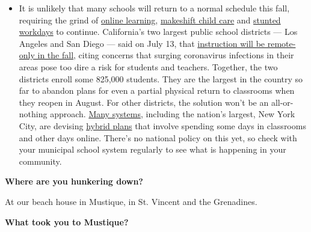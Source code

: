 \begin{itemize}
  \begin{itemize}
  \tightlist
  \item
    It is unlikely that many schools will return to a normal schedule
    this fall, requiring the grind of
    \href{https://www.nytimes3xbfgragh.onion/2020/06/05/us/coronavirus-education-lost-learning.html?action=click\&pgtype=Article\&state=default\&region=MAIN_CONTENT_3\&context=storylines_faq}{online
    learning},
    \href{https://www.nytimes3xbfgragh.onion/2020/05/29/us/coronavirus-child-care-centers.html?action=click\&pgtype=Article\&state=default\&region=MAIN_CONTENT_3\&context=storylines_faq}{makeshift
    child care} and
    \href{https://www.nytimes3xbfgragh.onion/2020/06/03/business/economy/coronavirus-working-women.html?action=click\&pgtype=Article\&state=default\&region=MAIN_CONTENT_3\&context=storylines_faq}{stunted
    workdays} to continue. California's two largest public school
    districts --- Los Angeles and San Diego --- said on July 13, that
    \href{https://www.nytimes3xbfgragh.onion/2020/07/13/us/lausd-san-diego-school-reopening.html?action=click\&pgtype=Article\&state=default\&region=MAIN_CONTENT_3\&context=storylines_faq}{instruction
    will be remote-only in the fall}, citing concerns that surging
    coronavirus infections in their areas pose too dire a risk for
    students and teachers. Together, the two districts enroll some
    825,000 students. They are the largest in the country so far to
    abandon plans for even a partial physical return to classrooms when
    they reopen in August. For other districts, the solution won't be an
    all-or-nothing approach.
    \href{https://bioethics.jhu.edu/research-and-outreach/projects/eschool-initiative/school-policy-tracker/}{Many
    systems}, including the nation's largest, New York City, are
    devising
    \href{https://www.nytimes3xbfgragh.onion/2020/06/26/us/coronavirus-schools-reopen-fall.html?action=click\&pgtype=Article\&state=default\&region=MAIN_CONTENT_3\&context=storylines_faq}{hybrid
    plans} that involve spending some days in classrooms and other days
    online. There's no national policy on this yet, so check with your
    municipal school system regularly to see what is happening in your
    community.
  \end{itemize}
\end{itemize}

\textbf{Where are you hunkering down?}

At our beach house in Mustique, in St. Vincent and the Grenadines.

\textbf{What took you to Mustique?}

